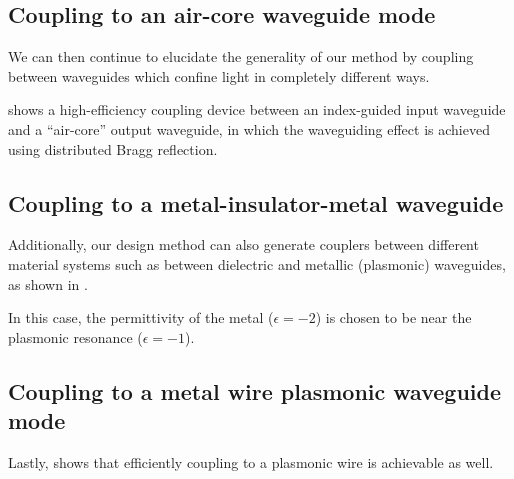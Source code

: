 \subsection{Coupling to an air-core waveguide mode}
We can then continue to elucidate the generality of our method
    by coupling between waveguides which confine light 
    in completely different ways.

 shows  a high-efficiency coupling device between 
    an index-guided input waveguide and
    a ``air-core'' output waveguide, 
    in which the waveguiding effect is achieved using distributed Bragg reflection.

\subsection{Coupling to a metal-insulator-metal waveguide }
Additionally, our design method can also generate couplers
    between different material systems such as 
    between dielectric and metallic (plasmonic) waveguides,
    as shown in .

In this case, the permittivity of the metal ($\epsilon = -2$) is chosen to be 
    near the plasmonic resonance ($\epsilon = -1$).

\subsection{Coupling to a metal wire plasmonic waveguide mode}
Lastly,  shows that efficiently coupling to a plasmonic wire
    is achievable as well.


